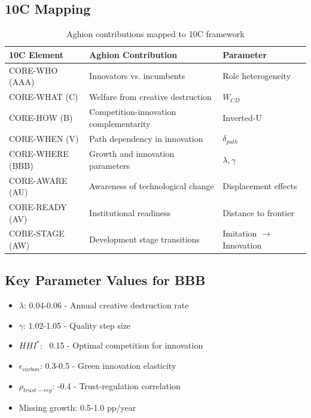 \subsection{10C Mapping}

\begin{table}[h]
\centering
\begin{tabular}{lll}
\textbf{10C Element} & \textbf{Aghion Contribution} & \textbf{Parameter} \\
\hline
CORE-WHO (AAA) & Innovators vs. incumbents & Role heterogeneity \\
CORE-WHAT (C) & Welfare from creative destruction & $W_{CD}$ \\
CORE-HOW (B) & Competition-innovation complementarity & Inverted-U \\
CORE-WHEN (V) & Path dependency in innovation & $\delta_{path}$ \\
CORE-WHERE (BBB) & Growth and innovation parameters & $\lambda, \gamma$ \\
CORE-AWARE (AU) & Awareness of technological change & Displacement effects \\
CORE-READY (AV) & Institutional readiness & Distance to frontier \\
CORE-STAGE (AW) & Development stage transitions & Imitation $\rightarrow$ Innovation \\
\end{tabular}
\caption{Aghion contributions mapped to 10C framework}
\end{table}

\subsection{Key Parameter Values for BBB}

\begin{tcolorbox}[colback=green!5!white, colframe=green!75!black, title=Aghion Parameters for BBB Repository]
\begin{itemize}
    \item $\lambda$: 0.04-0.06 - Annual creative destruction rate
    \item $\gamma$: 1.02-1.05 - Quality step size
    \item $HHI^*$: ~0.15 - Optimal competition for innovation
    \item $\epsilon_{carbon}$: 0.3-0.5 - Green innovation elasticity
    \item $\rho_{trust-reg}$: -0.4 - Trust-regulation correlation
    \item Missing growth: 0.5-1.0 pp/year
\end{itemize}
\end{tcolorbox}

